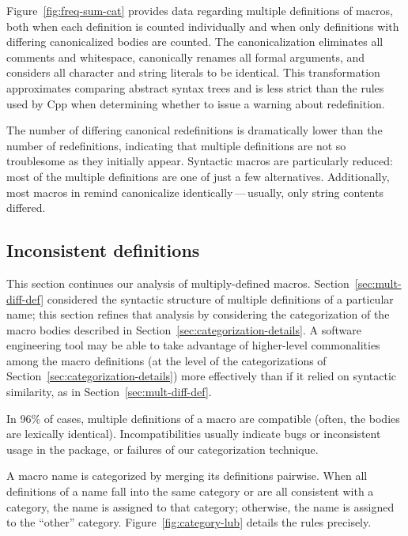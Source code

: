 \documentclass[10pt]{article}
\newcommand{\pkg}[1]{\textsf{#1}}
\begin{document}
Figure~\ref{fig:freq-sum-cat} provides data regarding multiple definitions
of macros, both when each definition is counted individually and when only
definitions with differing canonicalized bodies are counted.  The
canonicalization eliminates all comments and whitespace, canonically
renames all formal arguments, and considers all character and string
literals to be identical.  This transformation approximates comparing
abstract syntax trees and is less strict than the rules used by Cpp when
determining whether to issue a warning about redefinition.

The number of differing canonical redefinitions is dramatically lower than
the number of redefinitions, indicating that multiple definitions are not
so troublesome as they initially appear.  Syntactic macros are particularly
reduced: most of the multiple definitions are one of just a few
alternatives.  Additionally, most macros in \pkg{remind} canonicalize
identically\,---\,usually, only string contents differed.


\subsection{Inconsistent definitions}
\label{sec:inconsistent}

This section continues our analysis of multiply-defined macros.
Section~\ref{sec:mult-diff-def} considered the syntactic structure of
multiple definitions of a particular name; this section refines that
analysis by considering the categorization of the macro bodies described in
Section~\ref{sec:categorization-details}.  A software engineering tool may
be able to take advantage of higher-level commonalities among the macro
definitions (at the level of the categorizations of
Section~\ref{sec:categorization-details}) more effectively than if it
relied on syntactic similarity, as in Section~\ref{sec:mult-diff-def}.



In 96\% of cases, multiple definitions of a macro are compatible (often,
the bodies are lexically identical).  Incompatibilities usually indicate
bugs or inconsistent usage in the package, or failures of our
categorization technique.

A macro name is categorized by merging its definitions pairwise.  When all
definitions of a name fall into the same category or are all consistent
with a category, the name is assigned to that category; otherwise, the name
is assigned to the ``other'' category.  Figure~\ref{fig:category-lub}
details the rules precisely.
\end{document}
